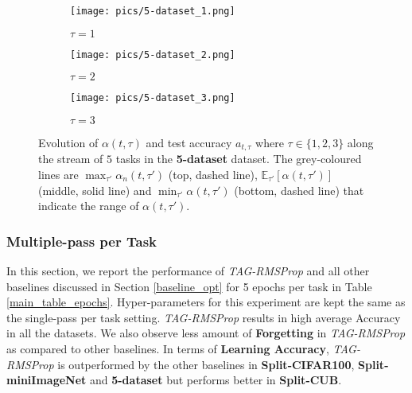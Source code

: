 \documentclass{article} \usepackage{collas2022_conference,times}
\begin{document}
    \begin{figure*}[t!]
        \centering
        \begin{subfigure}[b]{0.32\textwidth}
            \texttt{[image: pics/5-dataset\_1.png]}\caption{$\tau=1$}
        \end{subfigure}
        \hfill
        \begin{subfigure}[b]{0.32\textwidth}
            \texttt{[image: pics/5-dataset\_2.png]}\caption{$\tau=2$}
        \end{subfigure}
        \hfill
        \begin{subfigure}[b]{0.32\textwidth}
            \texttt{[image: pics/5-dataset\_3.png]}\caption{$\tau=3$}
        \end{subfigure}
        \caption{Evolution of $\alpha(t,\tau)$ and test accuracy $a_{t,\tau}$ where $\tau \in \{1,2,3\}$ along the stream of $5$ tasks in the \textbf{5-dataset} dataset. The grey-coloured lines are $\max_{\tau'} \alpha_n(t,\tau')$  (top, dashed line), $\mathbb{E}_{\tau'} [\alpha(t,\tau')]$  (middle, solid line) and $\min_{\tau'} \alpha(t,\tau')$  (bottom, dashed line) that indicate the range of $\alpha(t,\tau')$.}
        \label{alpha_5data_app}
    \end{figure*}
    
    \subsubsection{Multiple-pass per Task}\label{multi_pass}
    In this section, we report the performance of \textit{TAG-RMSProp} and all other baselines discussed in Section \ref{baseline_opt} for 5 epochs per task in Table \ref{main_table_epochs}. Hyper-parameters for this experiment are kept the same as the single-pass per task setting. \textit{TAG-RMSProp} results in high average Accuracy in all the datasets. We also observe less amount of \textbf{Forgetting} in \textit{TAG-RMSProp} as compared to other baselines. In terms of \textbf{Learning Accuracy}, \textit{TAG-RMSProp} is outperformed by the other baselines in \textbf{Split-CIFAR100}, \textbf{Split-miniImageNet} and \textbf{5-dataset} but performs better in \textbf{Split-CUB}.
\end{document}
